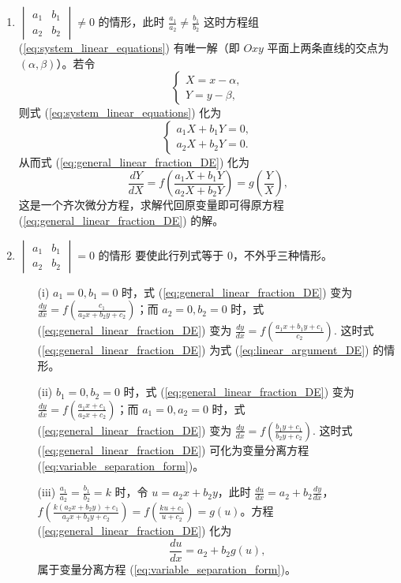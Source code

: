 \begin{solution}
\begin{enumerate}
    \item $\begin{vmatrix} a_1 & b_1 \\ a_2 & b_2 \end{vmatrix} \ne 0$ 的情形，此时 $\frac{a_1}{a_2} \ne \frac{b_1}{b_2}$
这时方程组 (\ref{eq:system_linear_equations}) 有唯一解（即 $Oxy$ 平面上两条直线的交点为 $(\alpha, \beta)$）。若令
\begin{equation}
\begin{cases} X = x-\alpha, \\ Y = y-\beta, \end{cases} \label{eq:translation_variables}
\end{equation}
则式 (\ref{eq:system_linear_equations}) 化为
\begin{equation}
\begin{cases} a_1X+b_1Y=0, \\ a_2X+b_2Y=0. \end{cases} \label{eq:translated_system}
\end{equation}
从而式 (\ref{eq:general_linear_fraction_DE}) 化为
\begin{equation}
\frac{dY}{dX} = f\left(\frac{a_1X+b_1Y}{a_2X+b_2Y}\right) = g\left(\frac{Y}{X}\right), \label{eq:transformed_homogeneous_DE_new_vars}
\end{equation}
这是一个齐次微分方程，求解代回原变量即可得原方程 (\ref{eq:general_linear_fraction_DE}) 的解。
    \item $\begin{vmatrix} a_1 & b_1 \\ a_2 & b_2 \end{vmatrix} = 0$ 的情形
要使此行列式等于 0，不外乎三种情形。
\begin{enumerate}
    \item[(i)] $a_1=0, b_1=0$ 时，式 (\ref{eq:general_linear_fraction_DE}) 变为 $\frac{dy}{dx}=f\left(\frac{c_1}{a_2x+b_2y+c_2}\right)$；而 $a_2=0, b_2=0$ 时，式 (\ref{eq:general_linear_fraction_DE}) 变为 $\frac{dy}{dx}=f\left(\frac{a_1x+b_1y+c_1}{c_2}\right)$. 这时式 (\ref{eq:general_linear_fraction_DE}) 为式 (\ref{eq:linear_argument_DE}) 的情形。
    \item[(ii)] $b_1=0, b_2=0$ 时，式 (\ref{eq:general_linear_fraction_DE}) 变为 $\frac{dy}{dx}=f\left(\frac{a_1x+c_1}{a_2x+c_2}\right)$；而 $a_1=0, a_2=0$ 时，式 (\ref{eq:general_linear_fraction_DE}) 变为 $\frac{dy}{dx}=f\left(\frac{b_1y+c_1}{b_2y+c_2}\right)$. 这时式 (\ref{eq:general_linear_fraction_DE}) 可化为变量分离方程 (\ref{eq:variable_separation_form})。
    \item[(iii)] $\frac{a_1}{a_2} = \frac{b_1}{b_2} = k$ 时，令 $u=a_2x+b_2y$，此时 $\frac{du}{dx}=a_2+b_2\frac{dy}{dx}$，$f\left(\frac{k(a_2x+b_2y)+c_1}{a_2x+b_2y+c_2}\right) = f\left(\frac{ku+c_1}{u+c_2}\right)=g(u)$。方程 (\ref{eq:general_linear_fraction_DE}) 化为
    $$\frac{du}{dx} = a_2+b_2g(u),$$
    属于变量分离方程 (\ref{eq:variable_separation_form})。
\end{enumerate}

\end{enumerate}
\end{solution}

